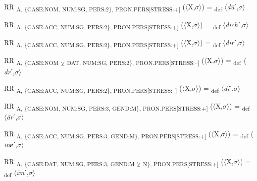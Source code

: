 {\begin{exe}
 RR \textsubscript{A, \{CASE:NOM, NUM:SG, PERS:2\}, PRON.PERS[STRESS:+]} ($\langle$X,$\sigma $$\rangle$) = \textsubscript{def} $\langle$\textit{d\=u}ˊ,$\sigma $$\rangle$
\end{exe}

\begin{exe}
 RR \textsubscript{A, \{CASE:ACC, NUM:SG, PERS:2\}, PRON.PERS[STRESS:+]} ($\langle$X,$\sigma $$\rangle$) = \textsubscript{def} $\langle$\textit{dich}ˊ,$\sigma $$\rangle$
\end{exe}

\begin{exe}
 RR \textsubscript{A, \{CASE:ACC, NUM:SG, PERS:2\}, PRON.PERS[STRESS:+]} ($\langle$X,$\sigma $$\rangle$) = \textsubscript{def} $\langle$\textit{d\=ir}ˊ,$\sigma $$\rangle$
\end{exe}

\begin{exe}
 RR \textsubscript{A, \{CASE:NOM} \textsubscript{${\veebar}$}\textsubscript{ DAT, NUM:SG, PERS:2\}, PRON.PERS[STRESS:–]} ($\langle$X,$\sigma $$\rangle$) = \textsubscript{def} $\langle$\textit{dr}ˊ,$\sigma $$\rangle$
\end{exe}

\begin{exe}
 RR \textsubscript{A, \{CASE:ACC, NUM:SG, PERS:2\}, PRON.PERS[STRESS:–]} ($\langle$X,$\sigma $$\rangle$) = \textsubscript{def} $\langle$\textit{di}ˊ,$\sigma $$\rangle$
\end{exe}

\begin{exe}
 RR \textsubscript{A, \{CASE:NOM, NUM:SG, PERS:3, GEND:M\}, PRON.PERS[STRESS:+]} ($\langle$X,$\sigma $$\rangle$) = \textsubscript{def} $\langle$\textit{\=ar}ˊ,$\sigma $$\rangle$
\end{exe}

\begin{exe}
 RR \textsubscript{A, \{CASE:ACC, NUM:SG, PERS:3, GEND:M\}, PRON.PERS[STRESS:+]} ($\langle$X,$\sigma $$\rangle$) = \textsubscript{def} $\langle$\textit{\=inɐ}ˊ,$\sigma $$\rangle$
\end{exe}

\begin{exe}
 RR \textsubscript{A, \{CASE:DAT, NUM:SG, PERS:3, GEND:M} \textsubscript{${\veebar}$}\textsubscript{ N\}, PRON.PERS[STRESS:+]} ($\langle$X,$\sigma $$\rangle$) = \textsubscript{def} $\langle$\textit{\=im}ˊ,$\sigma $$\rangle$
\end{exe}

}
